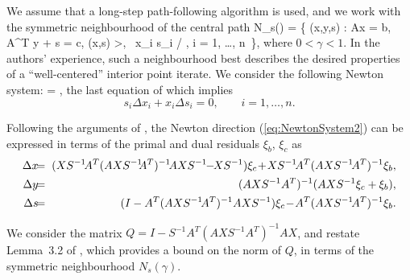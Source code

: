 We assume that a long-step path-following algorithm is used, 
and we work with the symmetric neighbourhood \cite{ColomboGondzio05}
of the central path 
%
\be \label{N8hood}
N_s(\gamma) = \{ (x,y,s) : Ax = b,\: A^T y + s = c,\: (x,s) \!>, \, 
  \gamma \mu \leq\! x_i s_i \leq\! \mu / \gamma, \;\; i = 1, \ldots, n \,\}, 
\ee
%
where $0 < \gamma < 1$. 
In the authors' experience, such a neighbourhood best describes the desired 
properties of a ``well-centered'' interior point iterate.
%
We consider the following Newton system:
\be \label{eq:NewtonSystem2}
 = 
\left[ \begin{array}{c}
    \xi_b \\ \xi_c \\ 0
  \end{array} \right],
\ee
the last equation of which implies
\[
 s_i\Delta x_i + x_i\Delta s_i = 0, \qquad i = 1, \ldots, n.
\]

Following the arguments of \cite{GondzioGrothey03}, the Newton
direction (\ref{eq:NewtonSystem2}) can be expressed in terms 
of the primal and dual residuals $\xi_b$, $\xi_c$ as
%
\begin{eqnarray}  \label{eq:Directions}
  \Delta x & \hspace{-1ex} = \hspace{-1ex} & 
  (XS^{-1} \! A^T (AXS^{-1} \!\! A^T)^{-1} \! AXS^{-1} \!\!-\!\! XS^{-1} )\xi_c
  \! + \! XS^{-1} \! A^T (AXS^{-1} \! A^T)^{-1} \xi_b, \nonumber \\
  \Delta y & \hspace{-1ex} = \hspace{-1ex} & 
  (AXS^{-1} A^T)^{-1} (AXS^{-1} \xi_c + \xi_b),                  \\
  \Delta s & \hspace{-1ex} = \hspace{-1ex} & 
  (I - A^T (AXS^{-1} \! A^T)^{-1} AXS^{-1} )\xi_c 
  \! - \! A^T (AXS^{-1} \! A^T)^{-1} \xi_b.            \nonumber
\end{eqnarray}

We consider the matrix
$Q\! =\! I - S^{-1} A^T (A X S^{-1}\! A^T)^{-1}\! A X$,
and restate Lemma~3.2 of \cite{GondzioGrothey03},
which provides a bound on the norm of $Q$, in terms of
the symmetric neighbourhood $N_s(\gamma)$.

